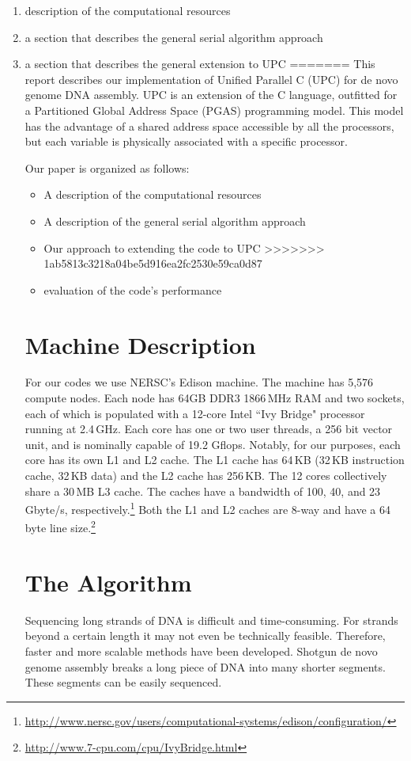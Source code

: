 \documentclass{article}
\begin{document}
\begin{enumerate} %
\item description of the computational resources
\item a section that describes the general serial algorithm approach
\item a section that describes the general extension to UPC
=======
This report describes our implementation of Unified Parallel C (UPC) for de novo genome DNA assembly. UPC is an extension of the C language, outfitted for a Partitioned Global Address Space (PGAS) programming model. This model has the advantage of a shared address space accessible by all the processors, but each variable is physically associated with a specific processor. 

Our paper is organized as follows:
\begin{itemize}
\item A description of the computational resources
\item A description of the general serial algorithm approach
\item Our approach to extending the code to UPC
>>>>>>> 1ab5813c3218a04be5d916ea2fc2530e59ca0d87
\item evaluation of the code's performance
\end{itemize}

\section{Machine Description}
For our codes we use NERSC's Edison machine. The machine has 5,576 compute nodes. Each node has 64GB DDR3 1866\,MHz RAM and two sockets, each of which is populated with a 12-core Intel ``Ivy Bridge" processor running at 2.4\,GHz. Each core has one or two user threads, a 256 bit vector unit, and is nominally capable of 19.2 Gflops. Notably, for our purposes, each core has its own L1 and L2 cache. The L1 cache has 64\,KB (32\,KB instruction cache, 32\,KB data) and the L2 cache has 256\,KB. The 12 cores collectively share a 30\,MB L3 cache. The caches have a bandwidth of 100, 40, and 23 Gbyte/s, respectively.\footnote{\url{http://www.nersc.gov/users/computational-systems/edison/configuration/}} Both the L1 and L2 caches are 8-way and have a 64 byte line size.\footnote{\url{http://www.7-cpu.com/cpu/IvyBridge.html}} 


\section{The Algorithm}
Sequencing long strands of DNA is difficult and time-consuming. For strands beyond a certain length it may not even be technically feasible. Therefore, faster and more scalable methods have been developed. Shotgun de novo genome assembly breaks a long piece of DNA into many shorter segments. These segments can be easily sequenced.


\end{enumerate}
\end{document}
